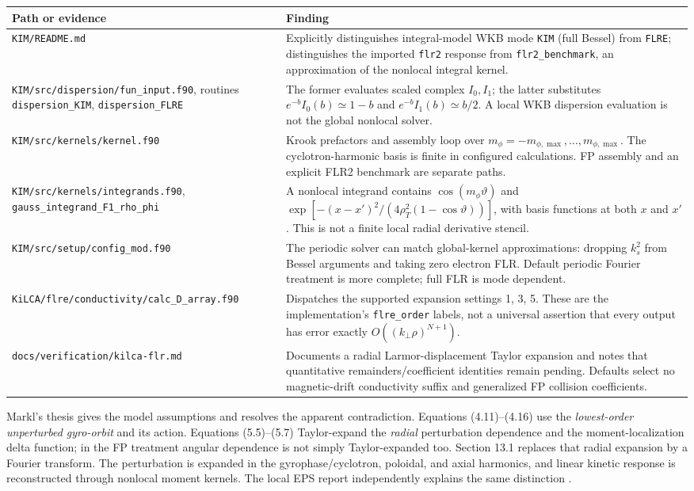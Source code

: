 \documentclass[10pt,a4paper]{article}
\newcommand{\pathref}[1]{\texttt{\nolinkurl{#1}}}
\begin{document}
\begin{longtable}{p{.21\linewidth}p{.69\linewidth}}
\toprule
Path or evidence & Finding \\ \midrule\endhead
\pathref{KIM/README.md} & Explicitly distinguishes integral-model WKB mode \texttt{KIM} (full Bessel) from \texttt{FLRE}; distinguishes the imported \texttt{flr2} response from \texttt{flr2\_benchmark}, an approximation of the nonlocal integral kernel.\\
\pathref{KIM/src/dispersion/fun_input.f90}, routines \texttt{dispersion\_KIM}, \texttt{dispersion\_FLRE} & The former evaluates scaled complex $I_0,I_1$; the latter substitutes $e^{-b}I_0(b)\simeq1-b$ and $e^{-b}I_1(b)\simeq b/2$. A local WKB dispersion evaluation is not the global nonlocal solver.\\
\pathref{KIM/src/kernels/kernel.f90} & Krook prefactors and assembly loop over $m_\phi=-m_{\phi,\max},\ldots,m_{\phi,\max}$. The cyclotron-harmonic basis is finite in configured calculations. FP assembly and an explicit FLR2 benchmark are separate paths.\\
\pathref{KIM/src/kernels/integrands.f90}, \pathref{gauss_integrand_F1_rho_phi} & A nonlocal integrand contains $\cos(m_\phi\vartheta)$ and $\exp[-(x-x')^2/(4\rho_T^2(1-\cos\vartheta))]$, with basis functions at both $x$ and $x'$. This is not a finite local radial derivative stencil.\\
\pathref{KIM/src/setup/config_mod.f90} & The periodic solver can match global-kernel approximations: dropping $k_s^2$ from Bessel arguments and taking zero electron FLR. Default periodic Fourier treatment is more complete; full FLR is mode dependent.\\
\pathref{KiLCA/flre/conductivity/calc_D_array.f90} & Dispatches the supported expansion settings 1, 3, 5. These are the implementation's \texttt{flre\_order} labels, not a universal assertion that every output has error exactly $O((k_\perp\rho)^{N+1})$.\\
\pathref{docs/verification/kilca-flr.md} & Documents a radial Larmor-displacement Taylor expansion and notes that quantitative remainders/coefficient identities remain pending. Defaults select no magnetic-drift conductivity suffix and generalized FP collision coefficients.\\
\bottomrule
\end{longtable}
Markl's thesis \cite{markl} gives the model assumptions and resolves the apparent contradiction. Equations (4.11)--(4.16) use the \emph{lowest-order unperturbed gyro-orbit} and its action. Equations (5.5)--(5.7) Taylor-expand the \emph{radial} perturbation dependence and the moment-localization delta function; in the FP treatment angular dependence is not simply Taylor-expanded too. Section 13.1 replaces that radial expansion by a Fourier transform. The perturbation is expanded in the gyrophase/cyclotron, poloidal, and axial harmonics, and linear kinetic response is reconstructed through nonlocal moment kernels. The local EPS report independently explains the same distinction \cite{kimeps}.
\end{document}

